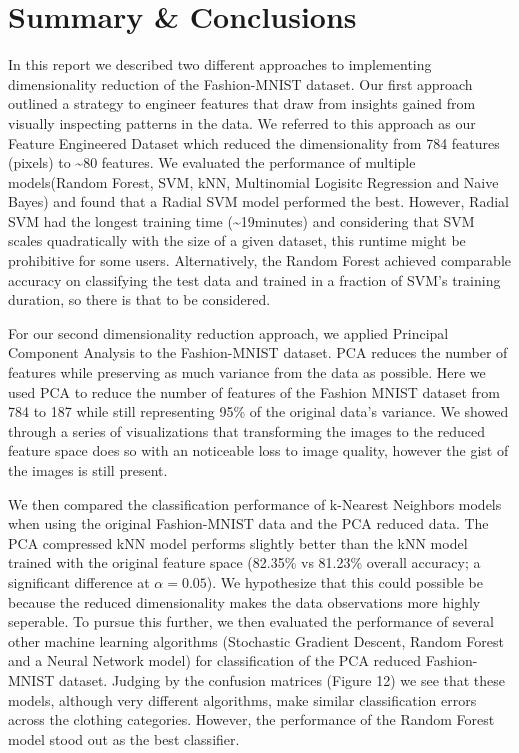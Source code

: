\documentclass{article}
\begin{document}
\hypertarget{summary-conclusions}{%
\section{Summary \& Conclusions}\label{summary-conclusions}}

In this report we described two different approaches to implementing
dimensionality reduction of the Fashion-MNIST dataset. Our first
approach outlined a strategy to engineer features that draw from
insights gained from visually inspecting patterns in the data. We
referred to this approach as our Feature Engineered Dataset which
reduced the dimensionality from 784 features (pixels) to
\textasciitilde80 features. We evaluated the performance of multiple
models(Random Forest, SVM, kNN, Multinomial Logisitc Regression and
Naive Bayes) and found that a Radial SVM model performed the best.
However, Radial SVM had the longest training time
(\textasciitilde19minutes) and considering that SVM scales quadratically
with the size of a given dataset, this runtime might be prohibitive for
some users. Alternatively, the Random Forest achieved comparable
accuracy on classifying the test data and trained in a fraction of SVM's
training duration, so there is that to be considered.

For our second dimensionality reduction approach, we applied Principal
Component Analysis to the Fashion-MNIST dataset. PCA reduces the number
of features while preserving as much variance from the data as possible.
Here we used PCA to reduce the number of features of the Fashion MNIST
dataset from 784 to 187 while still representing 95\% of the original
data's variance. We showed through a series of visualizations that
transforming the images to the reduced feature space does so with an
noticeable loss to image quality, however the gist of the images is
still present.

We then compared the classification performance of k-Nearest Neighbors
models when using the original Fashion-MNIST data and the PCA reduced
data. The PCA compressed kNN model performs slightly better than the kNN
model trained with the original feature space (82.35\% vs 81.23\%
overall accuracy; a significant difference at \(\alpha = 0.05\)). We
hypothesize that this could possible be because the reduced
dimensionality makes the data observations more highly seperable. To
pursue this further, we then evaluated the performance of several other
machine learning algorithms (Stochastic Gradient Descent, Random Forest
and a Neural Network model) for classification of the PCA reduced
Fashion-MNIST dataset. Judging by the confusion matrices (Figure 12) we
see that these models, although very different algorithms, make similar
classification errors across the clothing categories. However, the
performance of the Random Forest model stood out as the best classifier.
\end{document}
